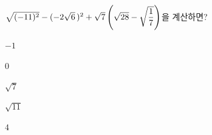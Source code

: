 $\sqrt{(-11)^2}-(-2\sqrt{6}\mkern3mu )^2+\sqrt{7}\left(\sqrt{28}-\sqrt{\dfrac{1}{7}}\right)$을 계산하면?
\begin{choices32}{\rule[-3ex]{0pt}{8ex}$-1$}{\rule[-3ex]{0pt}{8ex}$0$}{\rule[-3ex]{0pt}{8ex}$\sqrt{7}$}{\rule[-3ex]{0pt}{8ex}$\sqrt{11}$}{\rule[-3ex]{0pt}{8ex}$4$}\end{choices32}
